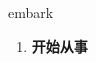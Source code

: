 
\begin{frame}
{\huge embark}
\begin{center}
\begin{enumerate}\Large
  \item \textbf{开始从事}
\end{enumerate}
\end{center}
\end{frame}
